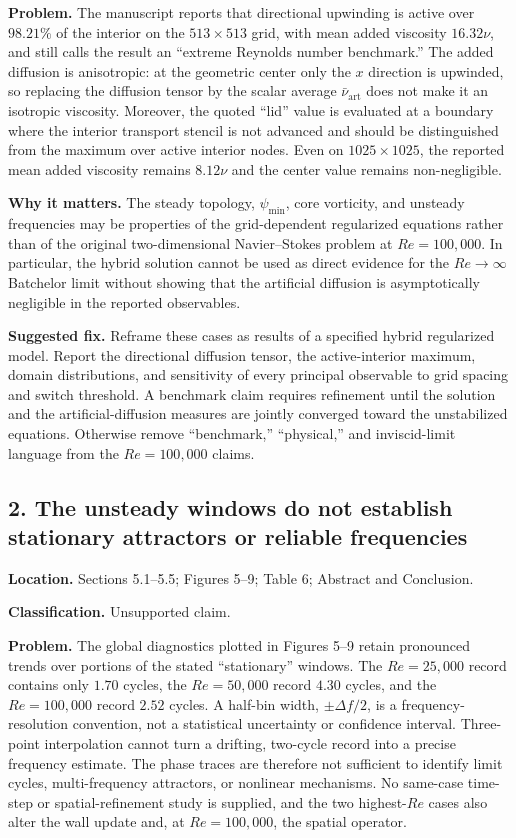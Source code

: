 \documentclass[11pt]{article}
\newcommand{\Rey}{\mathit{Re}}
\begin{document}
\textbf{Problem.} The manuscript reports that directional upwinding is active over $98.21\%$ of the interior on the $513\times513$ grid, with mean added viscosity $16.32\nu$, and still calls the result an ``extreme Reynolds number benchmark.'' The added diffusion is anisotropic: at the geometric center only the $x$ direction is upwinded, so replacing the diffusion tensor by the scalar average $\bar\nu_{\mathrm{art}}$ does not make it an isotropic viscosity. Moreover, the quoted ``lid'' value is evaluated at a boundary where the interior transport stencil is not advanced and should be distinguished from the maximum over active interior nodes. Even on $1025\times1025$, the reported mean added viscosity remains $8.12\nu$ and the center value remains non-negligible.

\textbf{Why it matters.} The steady topology, $\psi_{\min}$, core vorticity, and unsteady frequencies may be properties of the grid-dependent regularized equations rather than of the original two-dimensional Navier--Stokes problem at $\Rey=100{,}000$. In particular, the hybrid solution cannot be used as direct evidence for the $\Rey\to\infty$ Batchelor limit without showing that the artificial diffusion is asymptotically negligible in the reported observables.

\textbf{Suggested fix.} Reframe these cases as results of a specified hybrid regularized model. Report the directional diffusion tensor, the active-interior maximum, domain distributions, and sensitivity of every principal observable to grid spacing and switch threshold. A benchmark claim requires refinement until the solution and the artificial-diffusion measures are jointly converged toward the unstabilized equations. Otherwise remove ``benchmark,'' ``physical,'' and inviscid-limit language from the $\Rey=100{,}000$ claims.

\subsection*{2. The unsteady windows do not establish stationary attractors or reliable frequencies}

\textbf{Location.} Sections 5.1--5.5; Figures 5--9; Table 6; Abstract and Conclusion.

\textbf{Classification.} Unsupported claim.

\textbf{Problem.} The global diagnostics plotted in Figures 5--9 retain pronounced trends over portions of the stated ``stationary'' windows. The $\Rey=25{,}000$ record contains only $1.70$ cycles, the $\Rey=50{,}000$ record $4.30$ cycles, and the $\Rey=100{,}000$ record $2.52$ cycles. A half-bin width, $\pm\Delta f/2$, is a frequency-resolution convention, not a statistical uncertainty or confidence interval. Three-point interpolation cannot turn a drifting, two-cycle record into a precise frequency estimate. The phase traces are therefore not sufficient to identify limit cycles, multi-frequency attractors, or nonlinear mechanisms. No same-case time-step or spatial-refinement study is supplied, and the two highest-$\Rey$ cases also alter the wall update and, at $\Rey=100{,}000$, the spatial operator.
\end{document}
